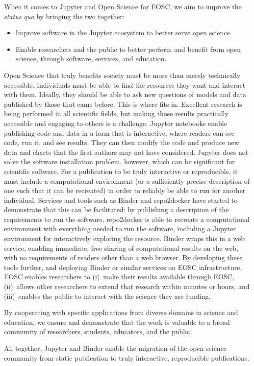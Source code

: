 When it comes to Jupyter and Open Science for EOSC, we aim to improve the
\textit{status quo} by bringing the two together:

\begin{itemize}
\item Improve software in the Jupyter ecosystem to better serve open
  science.
\item Enable researchers and the public to better perform and benefit
  from open science, through software, services, and education.
\end{itemize}

Open Science that truly benefits society must be more than merely
technically accessible.  Individuals must be able to find the
resources they want and interact with them.  Ideally, they should be
able to ask new questions of models and data published by those that
came before.  This is where \TheProject fits in.  Excellent research
is being performed in all scientific fields, but making those results
practically accessible and engaging to others is a challenge.
Jupyter notebooks enable publishing code and data in a form that is
interactive, where readers can see code, run it, and see results.
They can then modify the code and produce new data and charts that the
first authors may not have considered.  Jupyter does not solve the
software installation problem, however, which can be significant for
scientific software.  For a publication to be truly interactive or
reproducible, it must include a computational environment (or a
sufficiently precise description of one such that it can be recreated)
in order to reliably be able to run for another individual.  Services
and tools such as Binder and repo2docker have started to demonstrate
that this can be facilitated: by
publishing a description of the requirements to run the software,
repo2docker is able to recreate a computational environment with
everything needed to run the software, including a Jupyter
environment for interactively exploring the resource.  Binder wraps
this in a web service, enabling immediate, free sharing of
computational results on the web, with no requirements of readers
other than a web browser.  By developing these tools further, and deploying Binder or similar services on
EOSC infrastructure, EOSC enables researchers to (i)~make their results
available through EOSC, (ii)~allows other researchers to extend that
research within minutes or hours, and (iii)~enables the public to interact with the
science they are funding.

By cooperating with specific applications from diverse domains in science and education,
we ensure and demonstrate that the work is valuable to a broad community of researchers, students, educators, and the public.

All together, Jupyter and Binder enable the migration of the open
science community from static publication to truly interactive,
reproducible publications.



